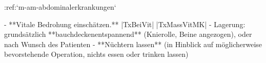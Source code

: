 :ref:`m-am-abdominalerkrankungen`
\begin{itemize}
  -   **Vitale Bedrohung einschätzen.** |TxBeiVit|
  |TxMassVitMK|
  -   Lagerung: grundsätzlich **bauchdeckenentspannend**
  (Knierolle, Beine angezogen), oder nach Wunsch des Patienten
  -   **Nüchtern lassen** (in Hinblick auf möglicherweise
  bevorstehende Operation, nichts essen oder trinken lassen)
\end{itemize}